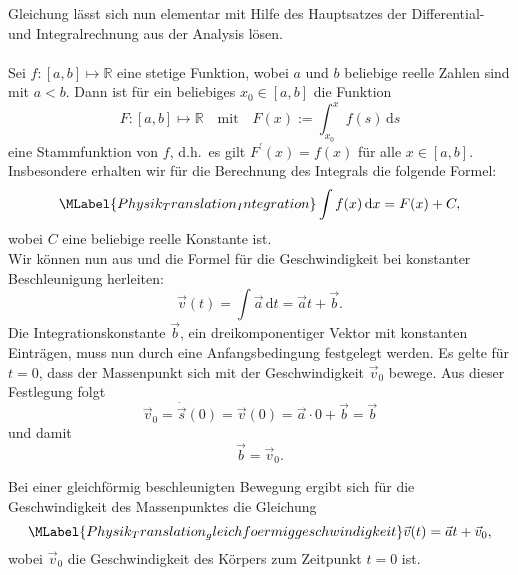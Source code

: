\begin{MContent}
     Gleichung  l\"asst sich nun elementar mit Hilfe des Hauptsatzes der Differential- und Integralrechnung aus der Analysis l\"osen.\\
     
     \\
     Sei $f:[a,b]\mapsto\mathbb{R}$ eine stetige Funktion, wobei $a$ und $b$ beliebige reelle Zahlen sind mit $a<b$. Dann ist f\"ur ein beliebiges $x_0\in[a,b]$ die Funktion
     \begin{equation*}
     F:[a,b]\mapsto\mathbb{R}\quad\text{mit}\quad F(x):=\int_{x_0}^x f(s)\,\textrm{d}s
     \end{equation*} eine Stammfunktion von $f$, d.h.~es gilt $F^{\prime}(x)=f(x)$ f\"ur alle $x\in [a,b]$. Insbesondere erhalten wir f\"ur die Berechnung des Integrals die folgende Formel:
     \begin{equation}\MLabel{Physik_Translation_Integration}
     \int f(x)\,\textrm{d}x=F(x)+C,
     \end{equation} wobei $C$ eine beliebige reelle Konstante ist.\\
     
     
     Wir k\"onnen nun aus  und  die Formel f\"ur die Geschwindigkeit bei konstanter Beschleunigung herleiten:
     \begin{equation*}
          \vec{v}(t)=\int \vec{a}\,\textrm{d}t=\vec{a}t + \vec{b}.
     \end{equation*}
     Die Integrationskonstante $\vec{b}$, ein dreikomponentiger Vektor mit konstanten Eintr\"agen, muss nun durch eine Anfangsbedingung festgelegt werden. Es gelte f\"ur $t=0$, dass der Massenpunkt sich mit der Geschwindigkeit $\vec{v}_0$ bewege. Aus dieser Festlegung folgt
     \begin{equation*}
     \vec{v}_0=\dot{\vec{s}}(0)=\vec{v}(0)=\vec{a}\cdot 0 + \vec{b}=\vec{b}
     \end{equation*} und damit 
     \begin{equation*}
     \vec{b}=\vec{v}_0.
     \end{equation*}
     
     \begin{MInfo}
     Bei einer gleichf\"ormig beschleunigten Bewegung ergibt sich f\"ur die Geschwindigkeit des Massenpunktes die Gleichung 
     \begin{equation}
          \MLabel{Physik_Translation_gleichfoermiggeschwindigkeit}
          \vec{v}(t)=\vec{a}t + \vec{v}_0,
     \end{equation}
     wobei $\vec{v}_0$ die Geschwindigkeit des K\"orpers zum Zeitpunkt $t=0$ ist.
     \end{MInfo}
     

\end{MContent}
